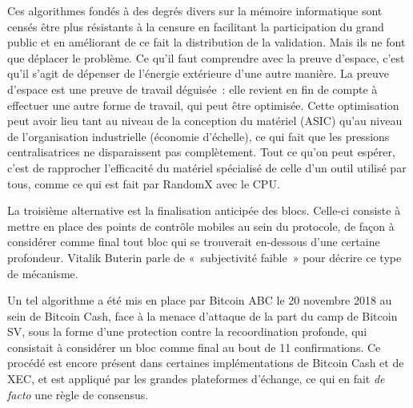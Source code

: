 Ces algorithmes fondés à des degrés divers sur la mémoire informatique sont censés être plus résistants à la censure en facilitant la participation du grand public et en améliorant de ce fait la distribution de la validation. Mais ils ne font que déplacer le problème. Ce qu'il faut comprendre avec la preuve d'espace, c'est qu'il s'agit de dépenser de l'énergie extérieure d'une autre manière. La preuve d'espace est une preuve de travail déguisée~: elle revient en fin de compte à effectuer une autre forme de travail, qui peut être optimisée. Cette optimisation peut avoir lieu tant au niveau de la conception du matériel (ASIC) qu'au niveau de l'organisation industrielle (économie d'échelle), ce qui fait que les pressions centralisatrices ne disparaissent pas complètement. Tout ce qu'on peut espérer, c'est de rapprocher l'efficacité du matériel spécialisé de celle d'un outil utilisé par tous, comme ce qui est fait par RandomX avec le CPU.


La troisième alternative est la finalisation anticipée des blocs. Celle-ci consiste à mettre en place des points de contrôle mobiles au sein du protocole, de façon à considérer comme final tout bloc qui se trouverait en-dessous d'une certaine profondeur. Vitalik Buterin parle de «~subjectivité faible~» pour décrire ce type de mécanisme.

Un tel algorithme a été mis en place par Bitcoin ABC le 20 novembre 2018 au sein de Bitcoin Cash, face à la menace d'attaque de la part du camp de Bitcoin SV, sous la forme d'une protection contre la recoordination profonde, qui consistait à considérer un bloc comme final au bout de 11 confirmations. Ce procédé est encore présent dans certaines implémentations de Bitcoin Cash et de XEC, et est appliqué par les grandes plateformes d'échange, ce qui en fait \emph{de facto} une règle de consensus. %

